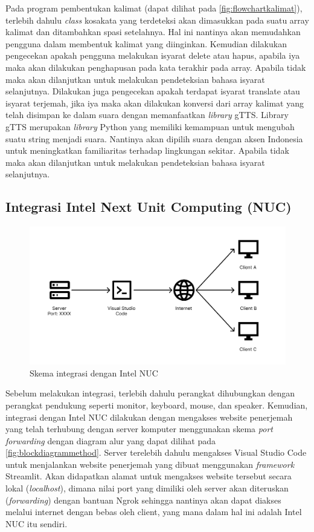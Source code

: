 Pada program pembentukan kalimat (dapat dilihat pada \ref{fig:flowchartkalimat}), terlebih dahulu \textit{class} kosakata yang terdeteksi akan dimasukkan pada suatu array kalimat dan ditambahkan spasi setelahnya. Hal ini nantinya akan memudahkan pengguna dalam membentuk kalimat yang diinginkan. Kemudian dilakukan pengecekan apakah pengguna melakukan isyarat delete atau hapus, apabila iya maka akan dilakukan penghapusan pada kata terakhir pada array. Apabila tidak maka akan dilanjutkan untuk melakukan pendeteksian bahasa isyarat selanjutnya. Dilakukan juga pengecekan apakah terdapat isyarat translate atau isyarat terjemah, jika iya maka akan dilakukan konversi dari array kalimat yang telah disimpan ke dalam suara dengan memanfaatkan \textit{library} gTTS. Library gTTS merupakan \textit{library} Python yang memiliki kemampuan untuk mengubah suatu string menjadi suara. Nantinya akan dipilih suara dengan aksen Indonesia untuk meningkatkan familiaritas terhadap lingkungan sekitar. Apabila tidak maka akan dilanjutkan untuk melakukan pendeteksian bahasa isyarat selanjutnya.

\subsection{Integrasi Intel Next Unit Computing (NUC)}
\begin{figure}[H]
  \centering

  \includegraphics[scale=0.9]{gambar/bab3-path-forwarding.png}

  \caption{Skema integrasi dengan Intel NUC}
  \label{fig:diagrampathforward}
\end{figure}

Sebelum melakukan integrasi, terlebih dahulu perangkat dihubungkan dengan perangkat pendukung seperti monitor, keyboard, mouse, dan speaker. Kemudian, integrasi dengan Intel NUC dilakukan dengan mengakses website penerjemah yang telah terhubung dengan server komputer menggunakan skema \emph{port forwarding} dengan diagram alur yang dapat dilihat pada \ref{fig:blockdiagrammethod}. Server terelebih dahulu mengakses Visual Studio Code untuk menjalankan website penerjemah yang dibuat menggunakan \emph{framework} Streamlit. Akan didapatkan alamat untuk mengakses website tersebut secara lokal (\emph{localhost}), dimana nilai port yang dimiliki oleh server akan diteruskan (\emph{forwarding}) dengan bantuan Ngrok sehingga nantinya akan dapat diakses melalui internet dengan bebas oleh client, yang mana dalam hal ini adalah Intel NUC itu sendiri.

